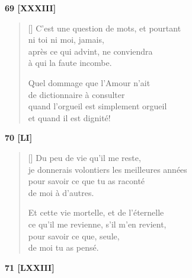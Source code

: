 \documentclass[a4paper,12pt]{book}
\begin{document}
\bigskip

\begin{center}
  \textbf{69 [XXXIII]}
\end{center}

\settowidth{\versewidth}{C'est une question de mots, et pourtant}

\begin{verse}[\versewidth]
  C'est une question de mots, et pourtant \\
  ni toi ni moi, jamais, \\
  après ce qui advint, ne conviendra \\
  à qui la faute incombe.

  Quel dommage que l'Amour n'ait \\
  de dictionnaire à consulter \\
  quand l'orgueil est simplement orgueil \\
  et quand il est dignité!
\end{verse}

\bigskip

\begin{center}
  \textbf{70 [LI]}
\end{center}

\settowidth{\versewidth}{je donnerais volontiers les meilleures années,}

\begin{verse}[\versewidth]
  Du peu de vie qu'il me reste, \\
  je donnerais volontiers les meilleures années \\
  pour savoir ce que tu as raconté \\
  de moi à d'autres.

  Et cette vie mortelle, et de l'éternelle \\
  ce qu'il me revienne, s'il m'en revient, \\
  pour savoir ce que, seule, \\
  de moi tu as pensé.
\end{verse}

\bigskip

\begin{center}
  \textbf{71 [LXXIII]}
\end{center}
\end{document}
